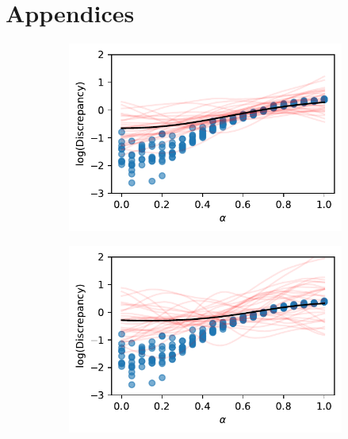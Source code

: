 \chapter{Appendices}

\begin{figure}[htbp]
    \centering
    \begin{subfigure}[b]{0.5\textwidth}
        \centering
        \includegraphics[width=\textwidth]{
            ../champagne_GP_images/initial_alpha_slice_log_discrep.pdf
        }
    \end{subfigure}%
    \hfill%
    \begin{subfigure}[b]{0.5\textwidth}
        \centering
        \includegraphics[width=\textwidth]{
            ../champagne_GP_images/alpha_slice_100_bolfi_updates_log_discrep.pdf
        }
    \end{subfigure}

\end{figure}
